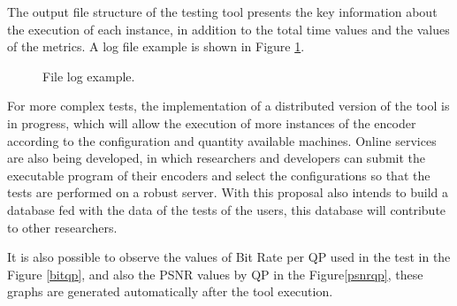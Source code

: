 \documentclass[journal]{IEEEtran}
\begin{document}
The output file structure of the testing tool presents the key information about the execution of each instance, in addition to the total time values and the values of the metrics. A log file example is shown in Figure \ref{fig:log}.

\FloatBarrier

\begin{figure}[!ht]
	\centering
	\caption{File log example.}
	\label{fig:log}
\end{figure}

\FloatBarrier

For more complex tests, the implementation of a distributed version of the tool is in progress, which will allow the execution of more instances of the encoder according to the configuration and quantity available machines. Online services are also being developed, in which researchers and developers can submit the executable program of their encoders and select the configurations so that the tests are performed on a robust server. With this proposal also intends to build a database fed with the data of the tests of the users, this database will contribute to other researchers.

It is also possible to observe the values of Bit Rate per QP used in the test in the Figure \ref{bitqp}, and also the PSNR values by QP in the Figure\ref{psnrqp}, these graphs are generated automatically after the tool execution.
\end{document}
